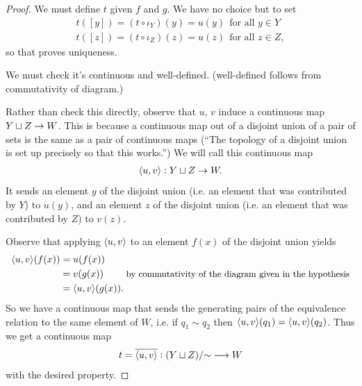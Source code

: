 \begin{proof}
  We must define $t$ given $f$ and $g$. We have no choice but to set
  \begin{align*}
    t([y]) = (t \circ \iota_Y)(y) = u(y) ~~\text{for all~} y \in Y\\
    t([z]) = (t \circ \iota_Z)(z) = u(z) ~~\text{for all~} z \in Z,
  \end{align*}
  so that proves uniqueness.

  We must check it's continuous and well-defined. (well-defined follows from commutativity of
  diagram.)

  Rather than check this directly, observe that $u$, $v$ induce a continuous
  map $Y \sqcup Z \to W$. This is because a continuous map out of a disjoint union of a pair of
  sets is the same as a pair of continuous maps (``The topology of a disjoint union is set up
  precisely so that this works.​'') We will call this continuous map
  \begin{align*}
    \langle u, v\rangle: Y \sqcup Z \to W.
  \end{align*}
  It sends an element $y$ of the disjoint union (i.e. an element that was contributed by $Y$)
  to $u(y)$, and an element $z$ of the disjoint union (i.e. an element that was contributed by $Z$)
  to $v(z)$.

  Observe that applying $\langle u, v\rangle$ to an element $f(x)$ of the disjoint union yields
  \begin{align*}
    \langle u, v\rangle(f(x))
    &= u(f(x)) \\
    &= v(g(x)) ~~~~~~~\text{\small by commutativity of the diagram given in the hypothesis} \\
    &= \langle u, v\rangle(g(x)).
  \end{align*}
  So we have a continuous map that sends the generating pairs of the equivalence relation to the
  same element of $W$, i.e. if $q_1 \sim q_2$ then $\langle u,v\rangle(q_1) = \langle u,v\rangle(q_2)$. Thus we get a
  continuous map
  \begin{align*}
    t = \overline{\langle u,v\rangle}:(Y \sqcup Z)/{\sim} \longrightarrow W
  \end{align*}
  with the desired property.
\end{proof}



